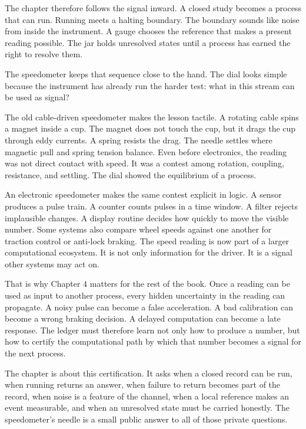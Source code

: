 The chapter therefore follows the signal inward. A closed study becomes a
process that can run. Running meets a halting boundary. The boundary sounds
like noise from inside the instrument. A gauge chooses the reference that makes
a present reading possible. The jar holds unresolved states until a process has
earned the right to resolve them.

The speedometer keeps that sequence close to the hand. The dial looks simple
because the instrument has already run the harder test: what in this stream can
be used as signal?

The old cable-driven speedometer makes the lesson tactile. A rotating cable
spins a magnet inside a cup. The magnet does not touch the cup, but it drags
the cup through eddy currents. A spring resists the drag. The needle settles
where magnetic pull and spring tension balance. Even before electronics, the
reading was not direct contact with speed. It was a contest among rotation,
coupling, resistance, and settling. The dial showed the equilibrium of a
process.

An electronic speedometer makes the same contest explicit in logic. A sensor
produces a pulse train. A counter counts pulses in a time window. A filter
rejects implausible changes. A display routine decides how quickly to move the
visible number. Some systems also compare wheel speeds against one another for
traction control or anti-lock braking. The speed reading is now part of a
larger computational ecosystem. It is not only information for the driver. It
is a signal other systems may act on.

That is why Chapter 4 matters for the rest of the book. Once a reading can be
used as input to another process, every hidden uncertainty in the reading can
propagate. A noisy pulse can become a false acceleration. A bad calibration can
become a wrong braking decision. A delayed computation can become a late
response. The ledger must therefore learn not only how to produce a number, but
how to certify the computational path by which that number becomes a signal for
the next process.

The chapter is about this certification. It asks when a closed record can be
run, when running returns an answer, when failure to return becomes part of the
record, when noise is a feature of the channel, when a local reference makes an
event measurable, and when an unresolved state must be carried honestly. The
speedometer's needle is a small public answer to all of those private
questions.

